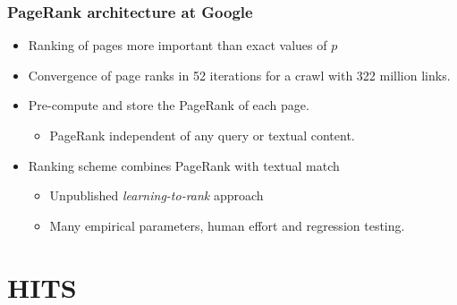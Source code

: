 \documentclass{beamer}
\begin{document}
\begin{frame}
  \frametitle{PageRank architecture at Google}

  \begin{itemize}
  \item Ranking of pages more important than exact values of $p$
  \item Convergence of page ranks in 52 iterations for a crawl with 322 million
    links.
  \item Pre-compute and store the PageRank of each page.
    \begin{itemize}
    \item PageRank independent of any query or textual content.
    \end{itemize}
  \item Ranking scheme combines PageRank with textual match
    \begin{itemize}
    \item Unpublished {\it learning-to-rank} approach
    \item Many empirical parameters, human effort and regression testing.
    \end{itemize}
  \end{itemize}

\end{frame}


\section{HITS}
\end{document}
